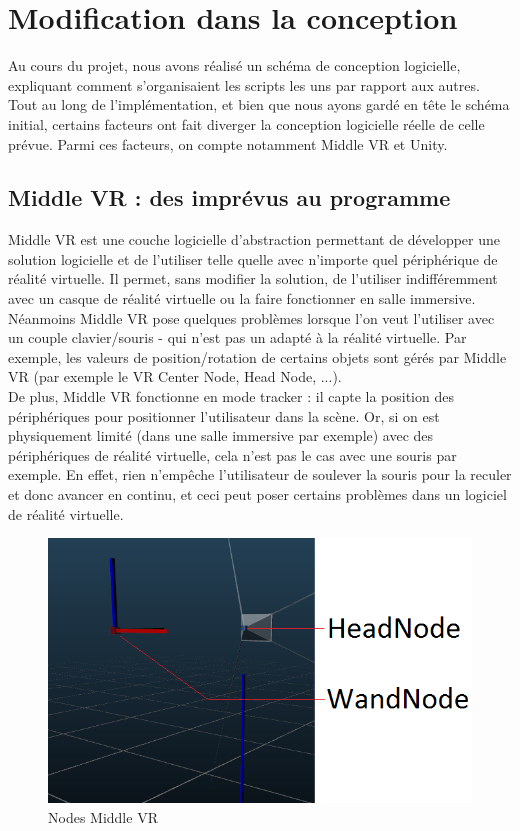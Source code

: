 \section{Modification dans la conception}

Au cours du projet, nous avons réalisé un schéma de conception logicielle, expliquant comment s'organisaient les scripts les uns par rapport aux autres.
Tout au long de l'implémentation, et bien que nous ayons gardé  en tête le schéma initial, certains facteurs ont fait diverger la conception logicielle réelle de celle prévue.
Parmi ces facteurs, on compte notamment Middle VR et Unity.

\subsection{Middle VR : des imprévus au programme}

Middle VR est une couche logicielle d'abstraction permettant de développer une solution logicielle et de l'utiliser telle quelle avec n'importe quel périphérique de réalité virtuelle.
Il permet, sans modifier la solution, de l'utiliser indifféremment avec un casque de réalité virtuelle ou la faire fonctionner en salle immersive.
Néanmoins Middle VR pose quelques problèmes lorsque l'on veut l'utiliser avec un couple clavier/souris - qui n'est pas un adapté à la réalité virtuelle.
Par exemple, les valeurs de position/rotation de certains objets sont gérés par Middle VR (par exemple le VR Center Node, Head Node, ...). \\
De plus, Middle VR fonctionne en mode tracker : il capte la position des périphériques pour positionner l'utilisateur dans la scène.
Or, si on est physiquement limité (dans une salle immersive par exemple) avec des périphériques de réalité virtuelle, cela n'est pas le cas avec une souris par exemple.
En effet, rien n'empêche l'utilisateur de soulever la souris pour la reculer et donc avancer en continu, et ceci peut poser certains problèmes dans un logiciel de réalité virtuelle.  

\begin{figure}[h]
	\centering
		\includegraphics[width=\linewidth]{7-RapportFinal/img/middleVR.PNG}
		\caption{Nodes Middle VR}
		\label{middleVR}
	
\end{figure}

